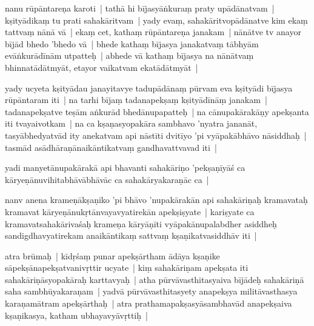 \documentclass[article,12pt,a4paper]{memoir}%
\newcounter{parCount}
\begin{document}
	  
	  \pstart \leavevmode%
	\label{thakur75-79.28}nanu rūpāntareṇa karoti | tathā hi bījasyāṅkuraṃ praty upādānatvam | kṣityādikaṃ tu prati sahakāritvam | yady evaṃ, sahakāritvopādānatve kim ekaṃ tattvaṃ nānā vā | ekaṃ cet, kathaṃ rūpāntareṇa janakam | nānātve tv anayor bījād bhedo 'bhedo vā | bhede kathaṃ bījasya janakatvaṃ tābhyām evāṅkurādīnām utpatteḥ | abhede vā kathaṃ bījasya na nānātvaṃ bhinnatādātmyāt, etayor vaikatvam ekatādātmyāt |
	{}
	\pend%
      

	  
	  \pstart \leavevmode%
	\label{thakur75-80.4}yady ucyeta kṣityādau janayitavye tadupādānaṃ pūrvam eva kṣityādi bījasya rūpāntaram iti | na tarhi bījaṃ tadanapekṣaṃ kṣityādīnāṃ janakam | tadanapekṣatve teṣām aṅkurād bhedānupapatteḥ | na cānupakārakāṇy apekṣanta iti tvayaivotkam | na ca kṣaṇasyopakāra sambhavo 'nyatra jananāt, tasyābhedyatvād ity anekatvam api nāstīti dvitīyo 'pi vyāpakābhāvo nāsiddhaḥ | tasmād asādhāraṇānaikāntikatvaṃ gandhavattvavad iti |
	{}
	\pend%
      

	  
	  \pstart \leavevmode%
	\label{thakur75-80.9}yadi manyetānupakārakā api bhavanti sahakāriṇo 'pekṣaṇīyāś ca kāryeṇānuvihitabhāvābhāvāc ca sahakāryakaraṇāc ca |
	{}
	\pend%
      

	  
	  \pstart \leavevmode%
	\label{thakur75-80.11}nanv anena krameṇākṣaṇiko 'pi bhāvo 'nupakārakān api sahakāriṇaḥ kramavataḥ kramavat kāryeṇānukṛtānvayavyatirekān apekṣiṣyate | kariṣyate ca kramavatsahakārivaśaḥ krameṇa kāryāṇīti vyāpakānupalabdher asiddheḥ sandigdhavyatirekam anaikāntikaṃ sattvaṃ kṣaṇikatvasiddhāv iti |
	{}
	\pend%
      

	  
	  \pstart \leavevmode%
	\label{thakur75-80.15}atra brūmaḥ | kīdṛśaṃ punar apekṣārtham ādāya kṣaṇike sāpekṣānapekṣatvanivṛttir ucyate | kiṃ sahakāriṇam apekṣata iti sahakāriṇāsyopakāraḥ karttavyaḥ | atha pūrvāvasthitasyaiva bījādeḥ sahakāriṇā saha sambhūyakaraṇam | yadvā pūrvāvasthitasyety anapekṣya militāvasthasya karaṇamātram apekṣārthaḥ | atra prathamapakṣasyāsambhavād anapekṣaiva kṣaṇikasya, katham ubhayavyāvṛttiḥ | 
	{}
	\pend%
      
\end{document}
